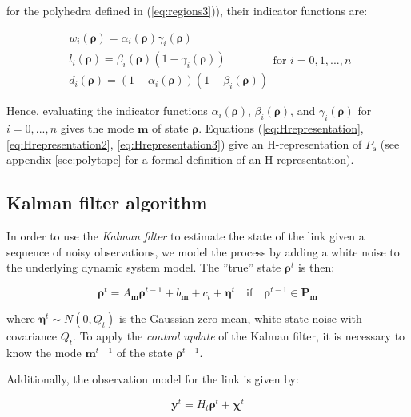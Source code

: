 \documentclass[11pt]{article}
\numberwithin{equation}{section}
\numberwithin{figure}{section}
\numberwithin{table}{section}
\begin{document}
\noindent for the polyhedra defined in (\ref{eq:regions3})), their indicator functions are:

\begin{equation}
\begin{array}{l}
w_{i}(\boldsymbol\rho)=\alpha_{i}(\boldsymbol\rho)\gamma_{i}(\boldsymbol\rho)\\
l_{i}(\boldsymbol\rho)=\beta_{i}(\boldsymbol\rho)(1-\gamma_{i}(\boldsymbol\rho))\\
d_{i}(\boldsymbol\rho)=(1-\alpha_{i}(\boldsymbol\rho))(1-\beta_{i}(\boldsymbol\rho))
\end{array}
\text{for }i=0,1,...,n
\label{eq:indicators2}
\end{equation}

Hence, evaluating the indicator functions $\alpha_{i}(\boldsymbol\rho)$, $\beta_{i}(\boldsymbol\rho)$, and $\gamma_{i}(\boldsymbol\rho)$ for $i=0,...,n$ gives the mode $\boldsymbol m$ of state $\boldsymbol\rho$. Equations (\ref{eq:Hrepresentation}, \ref{eq:Hrepresentation2}, \ref{eq:Hrepresentation3}) give an H-representation of $P_{\boldsymbol s}$ (see appendix \ref{sec:polytope} for a formal definition of an H-representation).


\subsection{Kalman filter algorithm}

In order to use the \textit{Kalman filter} to estimate the state of the link given a sequence of noisy observations, we model the process by adding a white noise to the underlying dynamic system model. The ''true'' state $\boldsymbol\rho^{t}$ is then:

\begin{equation}
\boldsymbol\rho^{t} = A_{\boldsymbol m} \boldsymbol\rho^{t-1} + b_{\boldsymbol m} + c_{t} + \boldsymbol\eta^{t} \quad\text{if}\quad\boldsymbol\rho^{t-1}\in\textbf{P}_{\boldsymbol m}
\label{eq:underlyingSystemDN3}
\end{equation}

\noindent where $\boldsymbol\eta^{t}\sim N(0,Q_{t})$ is the Gaussian zero-mean, white state noise with covariance $Q_{t}$. To apply the \textit{control update} of the Kalman filter, it is necessary to know the mode $\boldsymbol m^{t-1}$ of the state $\boldsymbol\rho^{t-1}$.

Additionally, the observation model for the link is given by:

\begin{equation}
\boldsymbol y^{t} = H_{t}\boldsymbol\rho^{t} + \boldsymbol\chi^{t}
\label{eq:observation}
\end{equation}
\end{document}
